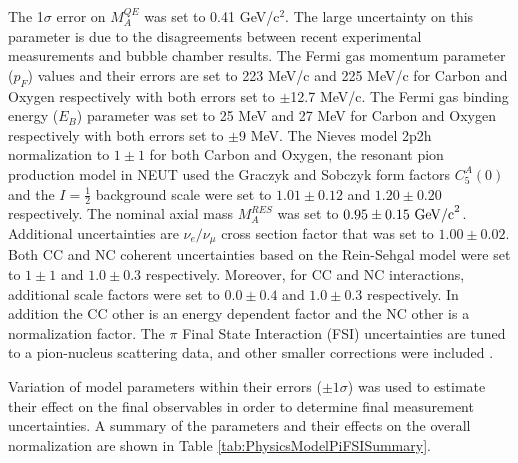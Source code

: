 The 1$\sigma$ error on $M^{QE}_A$ was set to 0.41 GeV/c$^2$.
The large uncertainty on this parameter is due to the disagreements between
recent experimental measurements and bubble chamber results\citep{maqe}.
The Fermi gas momentum parameter ($p_F$) values and their errors are set to 
223 MeV/c and 225 MeV/c for Carbon and Oxygen respectively 
with both errors set to $\pm$12.7 MeV/c. 
The Fermi gas binding energy ($E_B$) parameter was set to 
25 MeV and 27 MeV for Carbon and Oxygen respectively 
with both errors set to $\pm$9 MeV. 
The Nieves model 2p2h normalization to  $1\pm1$ 
for both Carbon and Oxygen,
the resonant pion production model in NEUT used the Graczyk and Sobczyk 
form factors $C^A_5(0)$ 
and the $I=\frac{1}{2}$ background scale 
were set to $1.01\pm0.12$ and $1.20\pm0.20$ respectively. 
The nominal axial mass $M^{RES}_A$ was set to $0.95\pm0.15 {\rm\  GeV/c}^2$.
Additional uncertainties are $\nu_e/\nu_\mu$ cross section factor 
that was set to $1.00\pm0.02$. Both CC and NC coherent uncertainties 
based on the Rein-Sehgal model
were set to $1\pm1$ and $1.0\pm0.3$ respectively. 
Moreover, for CC and NC interactions, additional scale factors
were set to $0.0\pm0.4$ and $1.0\pm0.3$ respectively.
In addition the CC other is an energy dependent factor\citep{tpc-analysis-paper}
and the NC other is a normalization factor.
The $\pi$ Final State Interaction (FSI) uncertainties 
are tuned to a pion-nucleus scattering data, and 
other smaller corrections were included  \citep{int-model}.

Variation of model parameters within their errors ($\pm1\sigma$) 
was used to estimate their effect on the final observables in order to
determine final measurement uncertainties.
A summary of the parameters and their effects on the overall normalization 
are shown in Table \ref{tab:PhysicsModelPiFSISummary}.

